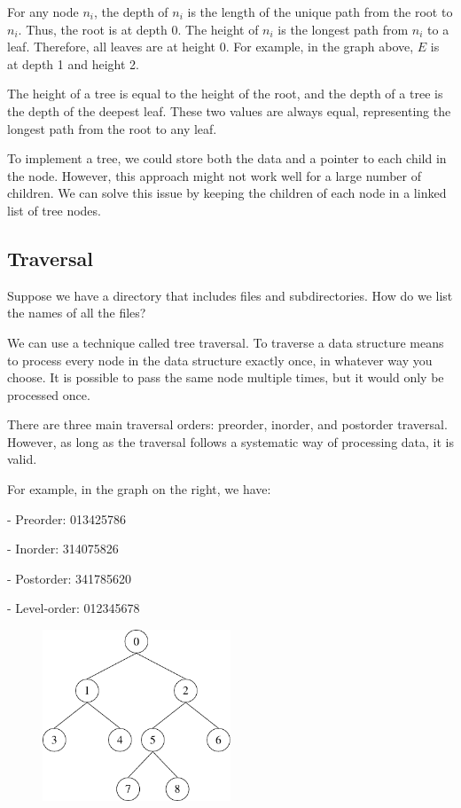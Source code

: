 For any node \(n_i\), the depth of \(n_i\) is the length of the unique path from the root to \(n_i\). Thus, the root is at depth 0. The height of \(n_i\) is the longest path from \(n_i\) to a leaf. Therefore, all leaves are at height 0. For example, in the graph above, \(E\) is at depth 1 and height 2.

The height of a tree is equal to the height of the root, and the depth of a tree is the depth of the deepest leaf. These two values are always equal, representing the longest path from the root to any leaf.

To implement a tree, we could store both the data and a pointer to each child in the node. However, this approach might not work well for a large number of children. We can solve this issue by keeping the children of each node in a linked list of tree nodes.

\subsection{Traversal}
Suppose we have a directory that includes files and subdirectories. How do we list the names of all the files?

We can use a technique called tree traversal. To traverse a data structure means to process every node in the data structure exactly once, in whatever way you choose. It is possible to pass the same node multiple times, but it would only be processed once.

There are three main traversal orders: preorder, inorder, and postorder traversal. However, as long as the traversal follows a systematic way of processing data, it is valid.

\begin{minipage}{0.5\textwidth}
For example, in the graph on the right, we have:

- Preorder: 013425786  

- Inorder: 314075826  

- Postorder: 341785620  

- Level-order: 012345678
\end{minipage}
\begin{minipage}{0.5\textwidth}
  \begin{figure}[H]
    \centering
    \includegraphics[width=0.5\textwidth]{Figure/Traversal.pdf}
  \end{figure}
\end{minipage}

